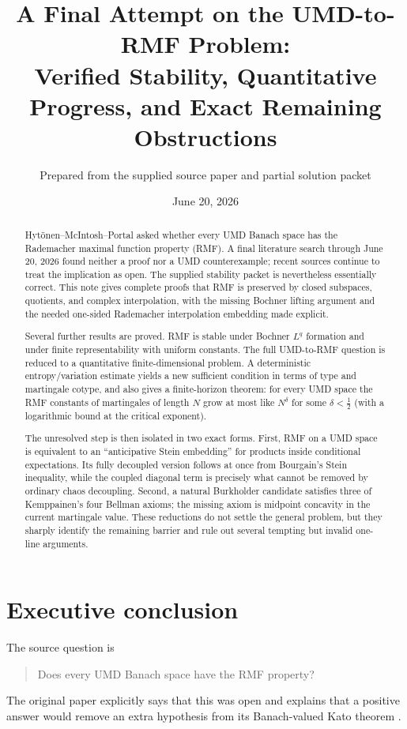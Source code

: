 \documentclass[11pt]{article}
\title{A Final Attempt on the UMD-to-RMF Problem:\\
Verified Stability, Quantitative Progress, and Exact Remaining Obstructions}
\author{Prepared from the supplied source paper and partial solution packet}
\date{June 20, 2026}
\theoremstyle{definition}
\newcommand{\1}{\mathbf 1}
\begin{document}
\maketitle

\begin{abstract}
Hyt\"onen--McIntosh--Portal asked whether every UMD Banach space has the
Rademacher maximal function property (RMF).  A final literature search through
June 20, 2026 found neither a proof nor a UMD counterexample; recent sources
continue to treat the implication as open.  The supplied stability packet is
nevertheless essentially correct.  This note gives complete proofs that RMF is
preserved by closed subspaces, quotients, and complex interpolation, with the
missing Bochner lifting argument and the needed one-sided Rademacher
interpolation embedding made explicit.

Several further results are proved.  RMF is stable under Bochner $L^q$
formation and under finite representability with uniform constants.  The full
UMD-to-RMF question is reduced to a quantitative finite-dimensional problem.
A deterministic entropy/variation estimate yields a new sufficient condition
in terms of type and martingale cotype, and also gives a finite-horizon theorem:
for every UMD space the RMF constants of martingales of length $N$ grow at most
like $N^\delta$ for some $\delta<\tfrac12$ (with a logarithmic bound at the
critical exponent).

The unresolved step is then isolated in two exact forms.  First, RMF on a UMD
space is equivalent to an ``anticipative Stein embedding'' for products inside
conditional expectations.  Its fully decoupled version follows at once from
Bourgain's Stein inequality, while the coupled diagonal term is precisely what
cannot be removed by ordinary chaos decoupling.  Second, a natural Burkholder
candidate satisfies three of Kemppainen's four Bellman axioms; the missing axiom
is midpoint concavity in the current martingale value.  These reductions do not
settle the general problem, but they sharply identify the remaining barrier and
rule out several tempting but invalid one-line arguments.
\end{abstract}

\section{Executive conclusion}

The source question is
\begin{quote}
Does every UMD Banach space have the RMF property?
\end{quote}
The original paper explicitly says that this was open and explains that a
positive answer would remove an extra hypothesis from its Banach-valued Kato
theorem \cite[Definition 2.12 and the paragraph following it]{HMP}.
\end{document}
